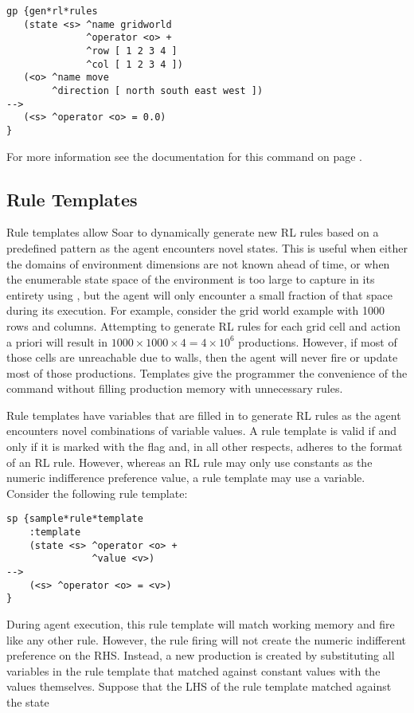 \begin{verbatim}
gp {gen*rl*rules
   (state <s> ^name gridworld
              ^operator <o> +
              ^row [ 1 2 3 4 ]
              ^col [ 1 2 3 4 ])
   (<o> ^name move
        ^direction [ north south east west ])
-->
   (<s> ^operator <o> = 0.0)
}
\end{verbatim}
	
For more information see the documentation for this command on page \pageref{gp}.

\subsection{Rule Templates}
\label{RL-templates}

Rule templates allow Soar to dynamically generate new RL rules based on a predefined pattern as the agent encounters novel states.
This is useful when either the domains of environment dimensions are not known ahead of time, or when the enumerable state space of the environment is too large to capture in its entirety using , but the agent will only encounter a small fraction of that space during its execution.
For example, consider the grid world example with 1000 rows and columns.
Attempting to generate RL rules for each grid cell and action a priori will result in $1000 \times 1000 \times 4 = 4 \times 10^6$ productions.
However, if most of those cells are unreachable due to walls, then the agent will never fire or update most of those productions.
Templates give the programmer the convenience of the  command without filling production memory with unnecessary rules.

Rule templates have variables that are filled in to generate RL rules as the agent encounters novel combinations of variable values.
A rule template is valid if and only if it is marked with the  flag and, in all other respects, adheres to the format of an RL rule.
However, whereas an RL rule may only use constants as the numeric indifference preference value, a rule template may use a variable.
Consider the following rule template:

\begin{verbatim}
sp {sample*rule*template
    :template
    (state <s> ^operator <o> +
               ^value <v>)
-->
    (<s> ^operator <o> = <v>)
}
\end{verbatim}

During agent execution, this rule template will match working memory and fire like any other rule.
However, the rule firing will not create the numeric indifferent preference on the RHS.
Instead, a new production is created by substituting all variables in the rule template that matched against constant values with the values themselves.
Suppose that the LHS of the rule template matched against the state

